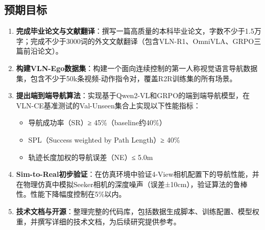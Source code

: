 \subsection{预期目标}
\begin{enumerate}
    \item \textbf{完成毕业论文与文献翻译}：撰写一篇高质量的本科毕业论文，字数不少于1.5万字；完成不少于3000词的外文文献翻译（包含VLN-R1、OmniVLA、GRPO三篇前沿论文）。
    \item \textbf{构建VLN-Ego数据集}：构建一个面向连续控制的第一人称视觉语言导航数据集，包含不少于50k条视频-动作指令对，覆盖R2R训练集的所有场景。
    \item \textbf{提出端到端导航算法}：实现基于Qwen2-VL和GRPO的端到端导航模型，在VLN-CE基准测试的Val-Unseen集合上实现以下性能指标：
    \begin{itemize}
        \item 导航成功率（SR）≥ 45\%（baseline约40\%）
        \item SPL（Success weighted by Path Length）≥ 40\%
        \item 轨迹长度加权的导航误差（NE）≤ 5.0m
    \end{itemize}
    \item \textbf{Sim-to-Real初步验证}：在仿真环境中验证4-View相机配置下的导航性能，并在物理仿真中模拟Seeker相机的深度噪声（误差±10cm），验证算法的鲁棒性。性能下降幅度控制在5\%以内。
    \item \textbf{技术文档与开源}：整理完整的代码库，包括数据生成脚本、训练配置、模型权重，并撰写详细的技术文档，为后续研究提供参考。
\end{enumerate}

